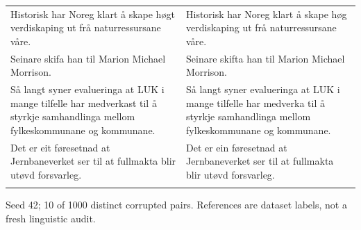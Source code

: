 \documentclass[10pt]{article}
\begin{document}
{\begin{tabular}{@{}>{\raggedright\arraybackslash}p{}@{\hspace{0.04\textwidth}}>{\raggedright\arraybackslash}p{}@{}}
Historisk har Noreg klart å skape høgt verdiskaping ut frå naturressursane våre. & Historisk har Noreg klart å skape høg verdiskaping ut frå naturressursane våre. \\ \addlinespace[5pt]
Seinare skifa han til Marion Michael Morrison. & Seinare skifta han til Marion Michael Morrison. \\ \addlinespace[5pt]
Så langt syner evalueringa at LUK i mange tilfelle har medverkast til å styrkje samhandlinga mellom fylkeskommunane og kommunane. & Så langt syner evalueringa at LUK i mange tilfelle har medverka til å styrkje samhandlinga mellom fylkeskommunane og kommunane. \\ \addlinespace[5pt]
Det er eit føresetnad at Jernbaneverket ser til at fullmakta blir utøvd forsvarleg. & Det er ein føresetnad at Jernbaneverket ser til at fullmakta blir utøvd forsvarleg. \\ \addlinespace[5pt]
\bottomrule\end{tabular}}%
\ifdim\dimexpr\ht\pairtable+\dp\pairtable\relax>0.82\textheight%
\resizebox*{!}{0.82\textheight}{\usebox{\pairtable}}%
\else\usebox{\pairtable}\fi%
\par\smallskip\footnotesize Seed 42; 10 of 1000 distinct corrupted pairs. References are dataset labels, not a fresh linguistic audit.\normalsize
\clearpage
\end{document}
